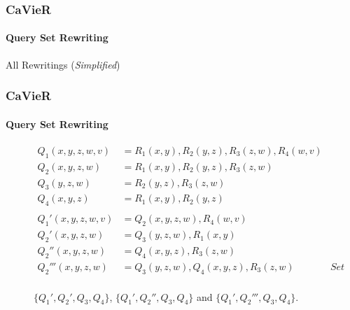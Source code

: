 \documentclass[
	11pt, %
]{beamer}
\begin{document}
\begin{frame}
	\frametitle{CaVieR}
	\framesubtitle{Query Set Rewriting}
	\begin{algorithm}[H]
		\caption{All Rewritings (\textit{Simplified})}\label{alg:AllRewriting}
		\begin{algorithmic}[1]
			\EndIf
			\Else
			\EndIf
			\EndFor
			\EndFunction
		\end{algorithmic}
	\end{algorithm}
\end{frame}

\begin{frame}
	\frametitle{CaVieR}
	\framesubtitle{Query Set Rewriting}
	\begin{figure}
		\begin{align*}
			Q_1(x,y,z,w,v) &= R_1(x,y), R_2(y,z), R_3(z,w), R_4(w,v)&\\
			Q_2(x,y,z,w) &= R_1(x,y), R_2(y,z), R_3(z,w) &\\
			Q_3(y,z,w) &= R_2(y,z), R_3(z,w)&\\
			Q_4(x,y,z) &= R_1(x,y), R_2(y,z)&\\\\
			Q_1'(x,y,z,w,v)& = Q_2(x,y,z,w), R_4(w,v)&\\
			Q_2'(x,y,z,w)& = Q_3(y,z,w), R_1(x,y)&\\
			Q_2''(x,y,z,w)& = Q_4(x,y,z), R_3(z,w)&\\
			Q_2'''(x,y,z,w)& = Q_3(y,z,w), Q_4(x,y,z), R_3(z,w)& \textit{Set semantics}\\
		\end{align*}
		
		$\{Q_1', Q_2', Q_3, Q_4\}$, $\{Q_1', Q_2'', Q_3, Q_4\}$ and $\{Q_1', Q_2''', Q_3, Q_4\}$.
	\end{figure}
\end{frame}

\end{document}
